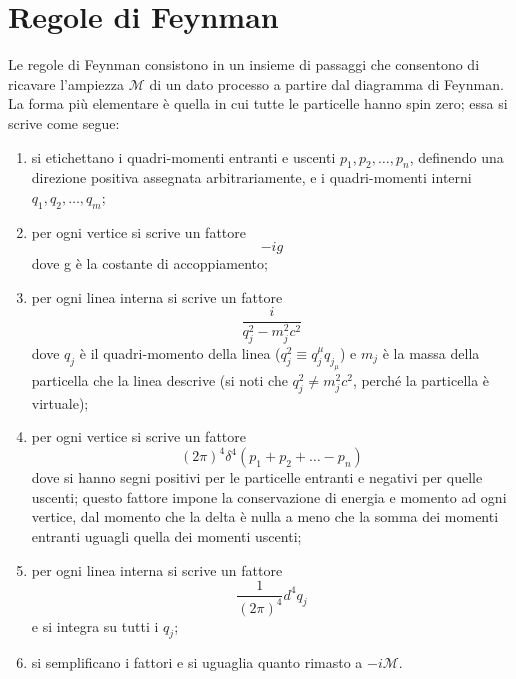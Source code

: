 \documentclass{subnucbo}
\begin{document}
\section{Regole di Feynman}
\label{app:feynman_rules}
Le regole di Feynman consistono in un insieme di passaggi che consentono di ricavare l'ampiezza $\mathcal{M}$ di un dato processo a partire dal diagramma di Feynman. La forma più elementare è quella in cui tutte le particelle hanno spin zero; essa si scrive come segue:
\begin{enumerate}
        \item si etichettano i quadri-momenti entranti e uscenti $p_{1}, p_{2}, \ldots, p_{n}$, definendo una direzione positiva assegnata arbitrariamente, e i quadri-momenti interni $q_{1}, q_{2}, \ldots, q_{m}$;
        \item per ogni vertice si scrive un fattore
                \begin{equation}
                        -ig
                \end{equation}
                dove g è la costante di accoppiamento;
        \item per ogni linea interna si scrive un fattore
                \begin{equation}
                        \frac { i } { q _ { j } ^ { 2 } - m _ { j } ^ { 2 } c ^ { 2 } }
                \end{equation}
                dove $q_{j}$ è il quadri-momento della linea ($q _ { j } ^ { 2 } \equiv q _ { j } ^ { \mu } q _ { j _ { \mu } }$) e $m_{j}$ è la massa della particella che la linea descrive (si noti che $q _ { j } ^ { 2 } \neq m _ { j } ^ { 2 } c ^ { 2 }$, perché la particella è virtuale);
        \item per ogni vertice si scrive un fattore
                \begin{equation}
                        ( 2 \pi ) ^ { 4 } \delta ^ { 4 } \left( p _ { 1 } + p _ { 2 } + \ldots - p _ { n } \right)
                \end{equation}
                dove si hanno segni positivi per le particelle entranti e negativi per quelle uscenti; questo fattore impone la conservazione di energia e momento ad ogni vertice, dal momento che la delta è nulla a meno che la somma dei momenti entranti uguagli quella dei momenti uscenti;
        \item per ogni linea interna si scrive un fattore \begin{equation}
                        \frac { 1 } { ( 2 \pi ) ^ { 4 } } d ^ { 4 } q _ { j }
                \end{equation}
                e si integra su tutti i $q_{j}$;
        \item si semplificano i fattori e si uguaglia quanto rimasto a $-i\mathcal{M}$.
\end{enumerate}
\end{document}
